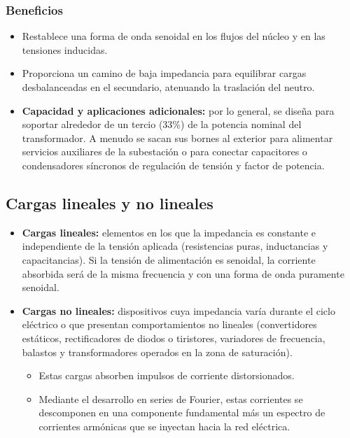 \documentclass[12pt]{article}
\begin{document}
\subsubsection*{Beneficios}
\begin{itemize}
    \item Restablece una forma de onda senoidal en los flujos del n\'ucleo y en las tensiones inducidas.
    \item Proporciona un camino de baja impedancia para equilibrar cargas desbalanceadas en el secundario, atenuando la traslaci\'on del neutro.
    \item \textbf{Capacidad y aplicaciones adicionales:} por lo general, se dise\~na para soportar alrededor de un tercio (33\%) de la potencia nominal del transformador. A menudo se sacan sus bornes al exterior para alimentar servicios auxiliares de la subestaci\'on o para conectar capacitores o condensadores s\'incronos de regulaci\'on de tensi\'on y factor de potencia.
\end{itemize}

\subsection{Cargas lineales y no lineales}
\begin{itemize}
    \item \textbf{Cargas lineales:} elementos en los que la impedancia es constante e independiente de la tensi\'on aplicada (resistencias puras, inductancias y capacitancias). Si la tensi\'on de alimentaci\'on es senoidal, la corriente absorbida ser\'a de la misma frecuencia y con una forma de onda puramente senoidal.
    \item \textbf{Cargas no lineales:} dispositivos cuya impedancia var\'ia durante el ciclo el\'ectrico o que presentan comportamientos no lineales (convertidores est\'aticos, rectificadores de diodos o tiristores, variadores de frecuencia, balastos y transformadores operados en la zona de saturaci\'on).
    \begin{itemize}
        \item Estas cargas absorben impulsos de corriente distorsionados.
        \item Mediante el desarrollo en series de Fourier, estas corrientes se descomponen en una componente fundamental m\'as un espectro de corrientes arm\'onicas que se inyectan hacia la red el\'ectrica.
    \end{itemize}
\end{itemize}
\end{document}
